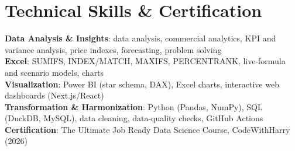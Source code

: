 \documentclass[letterpaper,10pt]{article}
\begin{document}
\section{Technical Skills \& Certification}
 \begin{itemize}[leftmargin=0.15in, label={}]
    \small{\item{
     \textbf{Data Analysis \& Insights}{: data analysis, commercial analytics, KPI and variance analysis, price indexes, forecasting, problem solving} \\
     \textbf{Excel}{: SUMIFS, INDEX/MATCH, MAXIFS, PERCENTRANK, live-formula and scenario models, charts} \\
     \textbf{Visualization}{: Power BI (star schema, DAX), Excel charts, interactive web dashboards (Next.js/React)} \\
     \textbf{Transformation \& Harmonization}{: Python (Pandas, NumPy), SQL (DuckDB, MySQL), data cleaning, data-quality checks, GitHub Actions} \\
     \textbf{Certification}{: The Ultimate Job Ready Data Science Course, CodeWithHarry (2026)}
    }}
 \end{itemize}
\end{document}
